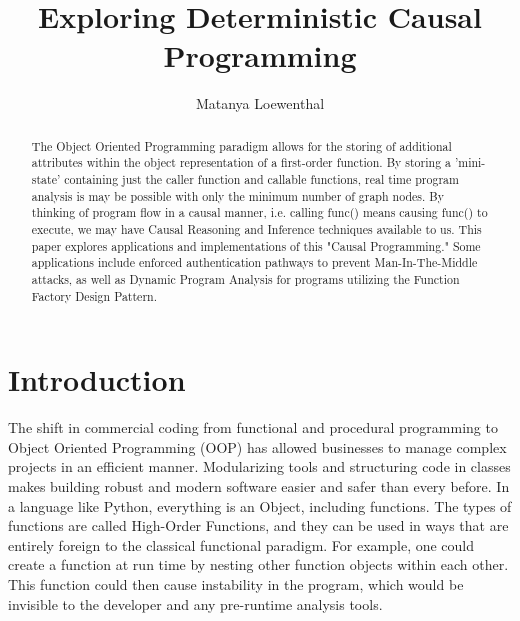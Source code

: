 \documentclass[runningheads]{llncs}
\begin{document}
%
\title{Exploring Deterministic Causal Programming}
%
%
\author{Matanya Loewenthal}
%
%
%
\maketitle              %
%
\begin{abstract}
The Object Oriented Programming paradigm allows for the storing of additional attributes within the object representation of a first-order function. By storing a 'mini-state' containing just the caller function and callable functions, real time program analysis is may be possible with only the minimum number of graph nodes. By thinking of program flow in a causal manner, i.e. calling func() means causing func() to execute, we may have Causal Reasoning and Inference techniques available to us. This paper explores applications and implementations of this "Causal Programming." Some applications include enforced authentication pathways to prevent Man-In-The-Middle attacks, as well as  Dynamic Program Analysis for programs utilizing the Function Factory Design Pattern.

\end{abstract}
%
%
%
\section{Introduction}

The shift in commercial coding from functional and procedural programming to Object Oriented Programming (OOP) has allowed businesses to manage complex projects in an efficient manner. Modularizing tools and structuring code in classes makes building robust and modern software easier and safer than every before. In a language like Python, everything is an Object, including functions. The types of functions are called High-Order Functions, and they can be used in ways that are entirely foreign to the classical functional paradigm. For example, one could create a function at run time by nesting other function objects within each other. This function could then cause instability in the program, which would be invisible to the developer and any pre-runtime analysis tools. 
\end{document}
